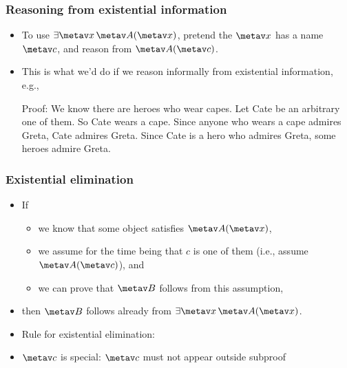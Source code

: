 \begin{frame}
  \frametitle{Reasoning from existential information}

  \begin{itemize}
    \item To use $\exists \metav x\,\metav A(\metav x)$, pretend the
    $\metav x$ has a name~$\metav c$, and reason from $\metav A(\metav
    c)$.
    \item This is what we'd do if we reason informally from existential information, e.g.,

\pause
Proof: We know there are heroes who wear capes. Let Cate be an
arbitrary one of them.  So Cate wears a cape. Since anyone who wears a
cape admires Greta, Cate admires Greta. Since Cate is a hero who
admires Greta, some heroes admire Greta.
\end{itemize}

\end{frame}

\begin{frame}
\frametitle{Existential elimination}

\begin{itemize}[<+->]
  \item If
  \begin{itemize}[<+->]
    \item we know that some object satisfies $\metav A(\metav x)$,
    \item we assume for the time being that $c$ is one of them (i.e.,
  assume $\metav A(\metav c)$), and
    \item we can prove that $\metav B$ follows from this assumption,
\end{itemize}
\item[] then $\metav B$ follows already from $\exists \metav x\, \metav A(\metav x)$.
\item Rule for existential elimination:

\begin{fitchproof}
  \open
\close
{}
\end{fitchproof}
\item $\metav c$ is special: $\metav c$ must not appear outside subproof
\end{itemize}
\end{frame}

